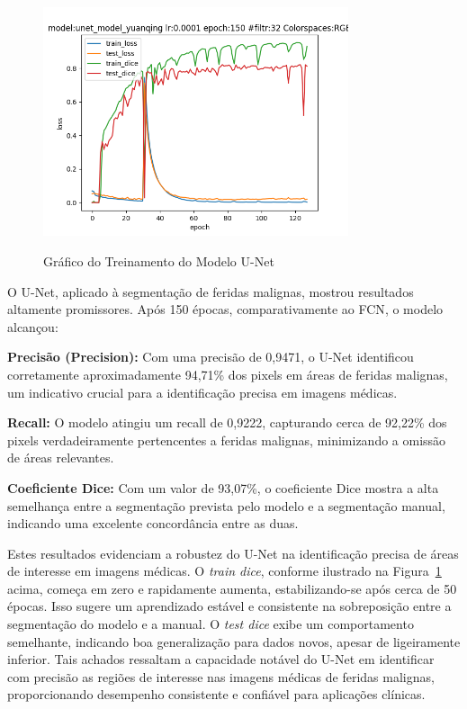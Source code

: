 \begin{figure}[htbp]
    \centering
    \caption{Gráfico do Treinamento do Modelo \acf{U-Net}}
    \includegraphics[width=0.8\textwidth]{img/unetprunedmodelfile.png}
    \label{fig:graphU-Net}
\end{figure}

O \ac{U-Net}, aplicado à segmentação de feridas malignas, mostrou resultados altamente promissores. Após 150 épocas, comparativamente ao \ac{FCN}, o modelo alcançou:

\textbf{Precisão (Precision):} Com uma precisão de 0,9471, o \ac{U-Net} identificou corretamente aproximadamente 94,71\% dos pixels em áreas de feridas malignas, um indicativo crucial para a identificação precisa em imagens médicas.

\textbf{Recall:} O modelo atingiu um recall de 0,9222, capturando cerca de 92,22\% dos pixels verdadeiramente pertencentes a feridas malignas, minimizando a omissão de áreas relevantes.

\textbf{Coeficiente Dice:} Com um valor de 93,07\%, o coeficiente Dice mostra a alta semelhança entre a segmentação prevista pelo modelo e a segmentação manual, indicando uma excelente concordância entre as duas.

Estes resultados evidenciam a robustez do \ac{U-Net} na identificação precisa de áreas de interesse em imagens médicas. O \textit{train dice}, conforme ilustrado na Figura~\ref{fig:graphU-Net} acima, começa em zero e rapidamente aumenta, estabilizando-se após cerca de 50 épocas. Isso sugere um aprendizado estável e consistente na sobreposição entre a segmentação do modelo e a manual. O \textit{test dice} exibe um comportamento semelhante, indicando boa generalização para dados novos, apesar de ligeiramente inferior. Tais achados ressaltam a capacidade notável do \ac{U-Net} em identificar com precisão as regiões de interesse nas imagens médicas de feridas malignas, proporcionando desempenho consistente e confiável para aplicações clínicas.

